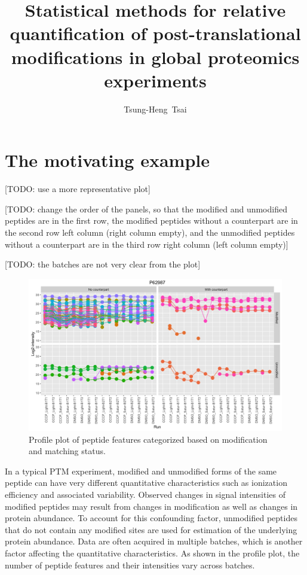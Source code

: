 \documentclass{mcp}
\title{Statistical methods for relative quantification of post-translational modifications in global proteomics experiments}
\author[1]{Tsung-Heng~Tsai}
\affil[1]{Northeastern University, Boston, MA, USA}
\def\todo#1{{\color{red}[TODO: #1]}}
\begin{document}



\section{The motivating example}
\label{sec:motiv}

\todo{use a more representative plot}

\todo{change the order of the panels, so that the modified and unmodified peptides are in the first row, the modified peptides without a counterpart are in the second row left column (right column empty), and the unmodified peptides without a counterpart are in the third row right column (left column empty)}

\todo{the batches are not very clear from the plot}

\begin{figure}[h!]
\centering
\includegraphics[width=.9\textwidth]{fig/ex_profile}
\caption{Profile plot of peptide features categorized based on modification and matching status.}
\end{figure}

In a typical PTM experiment, modified and unmodified forms of the same peptide can have very different quantitative characteristics such as ionization efficiency and associated variability. Observed changes in signal intensities of modified peptides may result from changes in modification as well as changes in protein abundance. To account for this confounding factor, unmodified peptides that do not contain any modified sites are used for estimation of the underlying protein abundance. Data are often acquired in multiple batches, which is another factor affecting the quantitative characteristics. As shown in the profile plot, the number of peptide features and their intensities vary across batches. 
\end{document}
